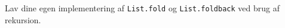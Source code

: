 \label{fold}Lav dine egen implementering af \lstinline{List.fold} og \lstinline{List.foldback} ved brug af rekursion. 
